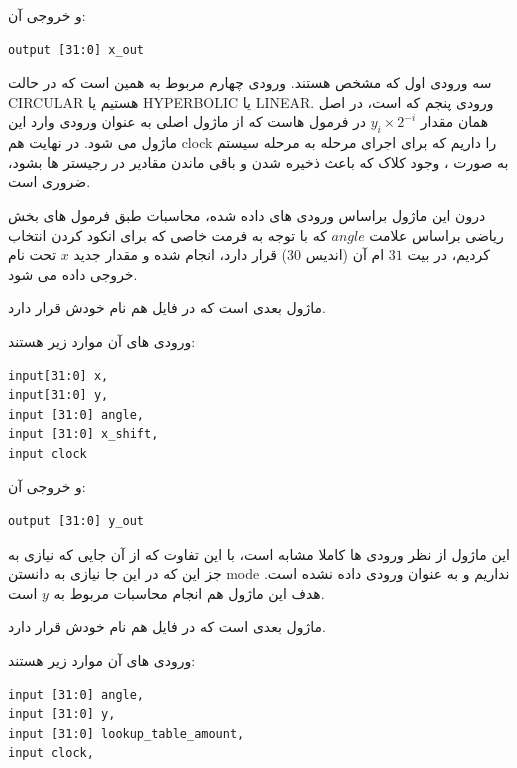 \documentclass[12pt,titlepage,a4page , tikz , multi,table , svgnames,xcdraw]{article}
\begin{document}
و خروجی آن:

\begin{latin}
\begin{verbatim}
output [31:0] x_out
\end{verbatim}
\end{latin}

سه ورودی اول که مشخص هستند. ورودی چهارم مربوط به همین است که در حالت CIRCULAR هستیم یا HYPERBOLIC یا LINEAR. ورودی پنجم که  است، در اصل همان مقدار $y_i \times 2^{-i}$ در فرمول هاست که از ماژول اصلی به عنوان ورودی وارد این ماژول می شود. در نهایت هم clock را داریم که برای اجرای مرحله به مرحله سیستم به صورت ، وجود کلاک که باعث ذخیره شدن و باقی ماندن مقادیر در رجیستر ها بشود، ضروری است.

درون این ماژول براساس ورودی های داده شده، محاسبات طبق فرمول های بخش ریاضی براساس علامت $angle$ که با توجه به فرمت خاصی که برای انکود کردن انتخاب کردیم، در بیت $31$ ام آن (اندیس $30$) قرار دارد، انجام شده و مقدار جدید $x$ تحت نام  خروجی داده می شود.

\hrulefill
 

ماژول بعدی  است که در فایل هم نام خودش قرار دارد.

 
 ورودی های آن موارد زیر هستند:

\begin{latin}
\begin{verbatim}
input[31:0] x,
input[31:0] y,
input [31:0] angle,
input [31:0] x_shift,
input clock
\end{verbatim}
\end{latin}

و خروجی آن:

\begin{latin}
\begin{verbatim}
output [31:0] y_out
\end{verbatim}
\end{latin}

این ماژول از نظر ورودی ها کاملا مشابه  است، با این تفاوت که از آن جایی که نیازی به جز این که در این جا نیازی به دانستن mode نداریم و به عنوان ورودی داده نشده است. هدف این ماژول هم انجام محاسبات مربوط به $y$ است.

\hrulefill


ماژول بعدی  است که در فایل هم نام خودش قرار دارد.

 
 ورودی های آن موارد زیر هستند:

\begin{latin}
\begin{verbatim}
input [31:0] angle,
input [31:0] y,
input [31:0] lookup_table_amount,
input clock,
\end{verbatim}
\end{latin}
\end{document}
